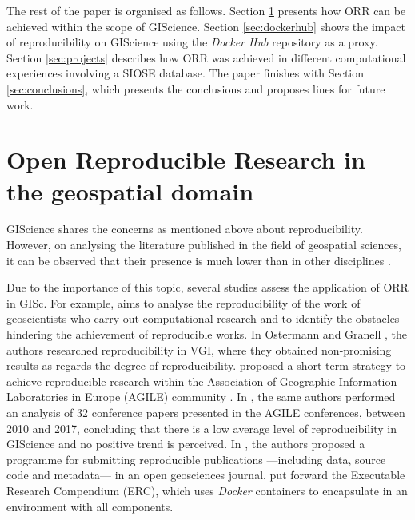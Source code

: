 \documentclass[ijgi,article,submit,moreauthors,pdftex]{Definitions/mdpi}
\begin{document}
The rest of the paper is organised as follows. Section \ref{sec:GISreproducibility} presents how ORR can be achieved within the scope of GIScience. Section \ref{sec:dockerhub} shows the impact of reproducibility on GIScience using the \textit{Docker Hub} repository as a proxy. Section \ref{sec:projects} describes how ORR was achieved in different computational experiences involving a SIOSE database. The paper finishes with Section \ref{sec:conclusions}, which presents the conclusions and proposes lines for future work.


\section{Open Reproducible Research in the geospatial domain}
\label{sec:GISreproducibility}

GIScience shares the concerns as mentioned above about reproducibility. However, on analysing the literature published in the field of geospatial sciences, it can be observed that their presence is much lower than in other disciplines \cite{giraud2017reproducible}. 

Due to the importance of this topic, several studies assess the application of ORR in GISc. For example, \cite{konkol2019computational} aims to analyse the reproducibility of the work of geoscientists who carry out computational research and to identify the obstacles hindering the achievement of reproducible works. In Ostermann and Granell \cite{ostermann2017advancing}, the authors researched reproducibility in VGI, where they obtained non-promising results as regards the degree of reproducibility. \cite{granell2018reproducible} proposed a short-term strategy to achieve reproducible research within the Association of Geographic Information Laboratories in Europe (AGILE) community \cite{agilewebsite}. In \cite{nust2018reproducible}, the same authors performed an analysis of 32 conference papers presented in the AGILE conferences, between 2010 and 2017, concluding that there is a low average level of reproducibility in GIScience and no positive trend is perceived. In \cite{skaggs2015reproducible}, the authors proposed a programme for submitting reproducible publications ---including data, source code and metadata--- in an open geosciences journal. \cite{nust2017opening} put forward the Executable Research Compendium (ERC), which uses \textit{Docker} containers to encapsulate in an environment with all components.
\end{document}
